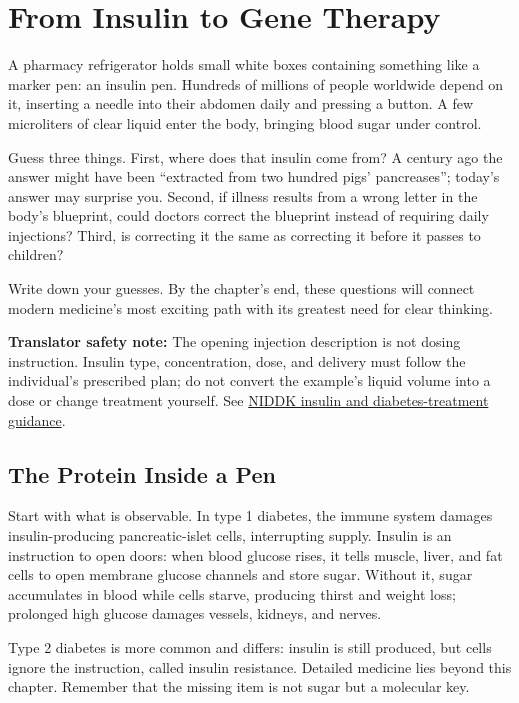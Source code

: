 \chapter{From Insulin to Gene Therapy}

\begin{kaichang}
A pharmacy refrigerator holds small white boxes containing something like a marker pen: an insulin pen. Hundreds of millions of people worldwide depend on it, inserting a needle into their abdomen daily and pressing a button. A few microliters of clear liquid enter the body, bringing blood sugar under control.

Guess three things. First, where does that insulin come from? A century ago the answer might have been ``extracted from two hundred pigs' pancreases''; today's answer may surprise you. Second, if illness results from a wrong letter in the body's blueprint, could doctors correct the blueprint instead of requiring daily injections? Third, is correcting it the same as correcting it before it passes to children?

Write down your guesses. By the chapter's end, these questions will connect modern medicine's most exciting path with its greatest need for clear thinking.
\end{kaichang}

\textbf{Translator safety note:} The opening injection description is not dosing instruction. Insulin type, concentration, dose, and delivery must follow the individual's prescribed plan; do not convert the example's liquid volume into a dose or change treatment yourself. See \href{https://www.niddk.nih.gov/health-information/diabetes/overview/insulin-medicines-treatments}{NIDDK insulin and diabetes-treatment guidance}.

\section{The Protein Inside a Pen}

Start with what is observable. In type 1 diabetes, the immune system damages insulin-producing pancreatic-islet cells, interrupting supply. Insulin is an instruction to open doors: when blood glucose rises, it tells muscle, liver, and fat cells to open membrane glucose channels and store sugar. Without it, sugar accumulates in blood while cells starve, producing thirst and weight loss; prolonged high glucose damages vessels, kidneys, and nerves.

Type 2 diabetes is more common and differs: insulin is still produced, but cells ignore the instruction, called insulin resistance. Detailed medicine lies beyond this chapter. Remember that the missing item is not sugar but a molecular key.

